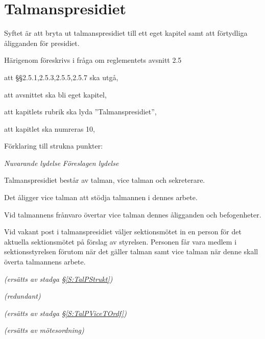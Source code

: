 \documentclass{article}
\newenvironment{lydelse}
    {\begin{paracol}{2}%
        \emph{Nuvarande lydelse}%
        \switchcolumn%
        \emph{Föreslagen lydelse}%
    \end{paracol}%
    \begin{enumerate}[label=\thesubsection.\arabic*]%
    \begin{paracol}{2}%
    }{\end{paracol}\end{enumerate}}
\begin{document}
\section{Talmanspresidiet}
Syftet är att bryta ut talmanspresidiet till ett eget kapitel samt att förtydliga åligganden för presidiet.

Härigenom föreskrivs i fråga om reglementets avsnitt 2.5

\begin{dels}
    \item att \S\S 2.5.1,2.5.3,2.5.5,2.5.7 ska utgå,
    \item att avsnittet ska bli eget kapitel,
    \item att kapitlets rubrik ska lyda ''Talmanspresidiet'',
    \item att kapitlet ska numreras 10,
\end{dels}

Förklaring till strukna punkter:
\begin{lydelse}
    \setcounter{section}{2}
    \setcounter{subsection}{5}
    \item Talmanspresidiet består av talman, vice talman och sekreterare.
    
    \setcounter{enumi}{2}
    \item Det åligger vice talman att stödja talmannen i dennes arbete.
    
    \setcounter{enumi}{4}
    \item Vid talmannens frånvaro övertar vice talman dennes åligganden och befogenheter.

    \setcounter{enumi}{6}    
    \item Vid vakant post i talmanspresidiet väljer sektionsmötet in en person för det aktuella sektionsmötet på förslag av styrelsen. Personen får vara medlem i sektionsstyrelsen förutom när det gäller talman samt vice talman när denne skall överta talmannens arbete. 
    
    \setcounter{section}{10}
    \setcounter{subsection}{0}
    \switchcolumn
    
    \item[] \emph{(ersätts av stadga \S \ref{S:TalPStrukt})}
    
    \vspace{1.2em}
    \item[] \emph{(redundant)}
    
    \vspace{1.2em}
    \item[] \emph{(ersätts av stadga \S \ref{S:TalPViceTOrdf})}
    
    \vspace{1.2em}
    \item[] \emph{(ersätts av mötesordning)}
    
\end{lydelse}
\end{document}

